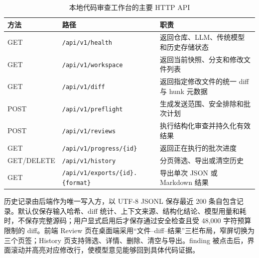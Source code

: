 \documentclass{experimentreport}
\begin{document}
{\begin{table}[H]
	\centering
	\caption{本地代码审查工作台的主要 HTTP API}
	\label{tab:api}
	\small
	\begin{tabularx}{\textwidth}{p{1.6cm}p{4.5cm}X}
		\toprule
		方法 & 路径 & 职责 \\
		\midrule
		GET & \texttt{/api/v1/health} & 返回仓库、LLM、传统模型和历史存储状态 \\
		GET & \texttt{/api/v1/workspace} & 返回当前快照、分支和修改文件列表 \\
		GET & \texttt{/api/v1/diff} & 返回指定修改文件的统一 diff 与 hunk 元数据 \\
		POST & \texttt{/api/v1/preflight} & 生成发送范围、安全排除和批次计划 \\
		POST & \texttt{/api/v1/reviews} & 执行结构化审查并持久化有效结果 \\
		GET & \texttt{/api/v1/progress/\{id\}} & 返回正在执行的批次进度 \\
		GET/DELETE & \texttt{/api/v1/history} & 分页筛选、导出或清空历史 \\
		GET & \texttt{/api/v1/exports/\{id\}.\{format\}} & 导出单次 JSON 或 Markdown 结果 \\
		\bottomrule
	\end{tabularx}
\end{table}

历史记录由后端作为唯一写入方，以 UTF-8 JSONL 保存最近 200 条自包含记录。默认仅保存输入哈希、diff 统计、上下文来源、结构化结论、模型用量和耗时，不保存完整源码；用户显式启用后才保存通过安全检查且受 48,000 字符预算限制的 diff。前端 Review 页在桌面端采用“文件--diff--结果”三栏布局，窄屏切换为三个页签；History 页支持筛选、详情、删除、清空与导出。finding 被点击后，界面滚动并高亮对应修改行，使模型意见能够回到具体代码证据。

}

\end{document}
